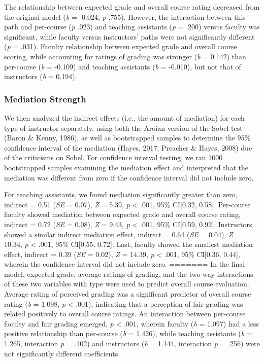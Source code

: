 \documentclass[man]{apa6}
\theoremstyle{definition}
\theoremstyle{definition}
\theoremstyle{definition}
\theoremstyle{remark}
\begin{document}
The relationship between expected grade and overall course rating
decreased from the original model (\emph{b} = -0.024, \emph{p} .755).
However, the interaction between this path and per-course (\emph{p}
.023) and teaching assistants (\emph{p} = .200) versus faculty was
significant, while faculty versus instructors' paths were not
significantly different (\emph{p} = .031). Faculty relationship between
expected grade and overall course scoring, while accounting for ratings
of grading was stronger (\emph{b} = 0.142) than per-course (\emph{b} =
-0.109) and teaching assistants (\emph{b} = -0.010), but not that of
instructors (\emph{b} = 0.194).

\subsubsection{Mediation Strength}\label{mediation-strength}

We then analyzed the indirect effects (i.e., the amount of mediation)
for each type of instructor separately, using both the Aroian version of
the Sobel test (Baron \& Kenny, 1986), as well as bootstrapped samples
to determine the 95\% confidence interval of the mediation (Hayes, 2017;
Preacher \& Hayes, 2008) due of the criticisms on Sobel. For confidence
interval testing, we ran 1000 bootstrapped samples examining the
mediation effect and interpreted that the mediation was different from
zero if the confidence interval did not include zero.

For teaching assistants, we found mediation significantly greater than
zero, indirect = 0.51 (\emph{SE} = 0.07), \emph{Z} = 5.39, \emph{p}
\textless{} .001, 95\% CI{[}0.32, 0.58{]}. Per-course faculty showed
mediation between expected grade and overall course rating, indirect =
0.72 (\emph{SE} = 0.08), \emph{Z} = 9.43, \emph{p} \textless{} .001,
95\% CI{[}0.59, 0.92{]}. Instructors showed a similar indirect mediation
effect, indirect = 0.64 (\emph{SE} = 0.04), \emph{Z} = 10.34, \emph{p}
\textless{} .001, 95\% CI{[}0.55, 0.72{]}. Last, faculty showed the
smallest mediation effect, indirect = 0.39 (\emph{SE} = 0.02), \emph{Z}
= 14.39, \emph{p} \textless{} .001, 95\% CI{[}0.36, 0.44{]}, wherein the
confidence interval did not include zero.
=======
In the final model, expected grade, average ratings of grading, and the two-way interactions of these two variables with type were used to predict overall course evaluation. Average rating of perceived grading was a significant predictor of overall course rating (\emph{b} = 1.098, \emph{p} \textless{} .001), indicating that a perception of fair grading was related positively to overall course ratings. An interaction between per-course faculty and fair grading emerged, \emph{p} \textless{} .001, wherein faculty (\emph{b} = 1.097) had a less positive relationship than per-course (\emph{b} = 1.426), while teaching assistants (\emph{b} = 1.265, interaction \emph{p} = .102) and instructors (\emph{b} = 1.144, interaction \emph{p} = .256) were not significantly different coefficients.
\end{document}
